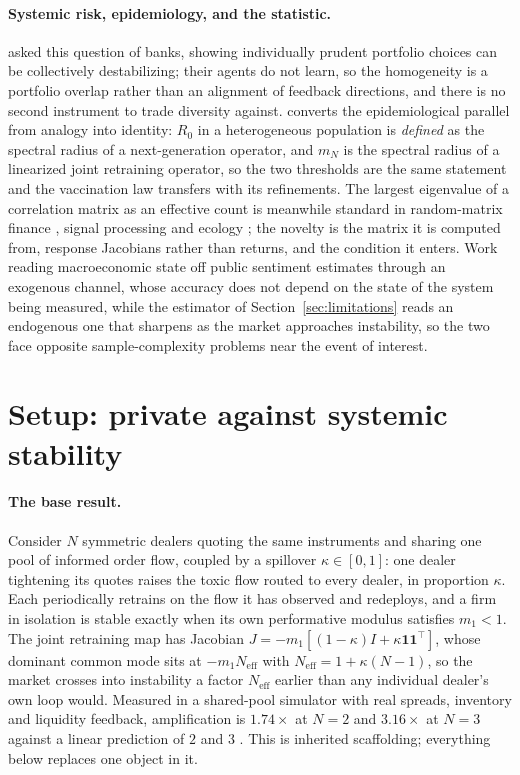\documentclass{article}
\theoremstyle{plain}
\theoremstyle{definition}
\newcommand{\Neff}{N_{\mathrm{eff}}}
\newcommand{\mN}{m_N}
\begin{document}
\paragraph{Systemic risk, epidemiology, and the statistic.}
\citet{beale2011} asked this question of banks, showing individually prudent portfolio choices can be collectively destabilizing; their agents do not learn, so the homogeneity is a portfolio overlap rather than an alignment of feedback directions, and there is no second instrument to trade diversity against. \citet{diekmann1990} converts the epidemiological parallel from analogy into identity: $R_0$ in a heterogeneous population is \emph{defined} as the spectral radius of a next-generation operator, and $\mN$ is the spectral radius of a linearized joint retraining operator, so the two thresholds are the same statement and the vaccination law transfers with its refinements. The largest eigenvalue of a correlation matrix as an effective count is meanwhile standard in random-matrix finance \citep{laloux1999,plerou2002}, signal processing \citep{roy2007} and ecology \citep{hill1973}; the novelty is the matrix it is computed from, response Jacobians rather than returns, and the condition it enters. Work reading macroeconomic state off public sentiment \citep{pebsa2024} estimates through an exogenous channel, whose accuracy does not depend on the state of the system being measured, while the estimator of Section~\ref{sec:limitations} reads an endogenous one that sharpens as the market approaches instability, so the two face opposite sample-complexity problems near the event of interest.

\section{Setup: private against systemic stability}
\label{sec:setup}

\paragraph{The base result.}
Consider $N$ symmetric dealers quoting the same instruments and sharing one pool of informed order flow, coupled by a spillover $\kappa \in [0,1]$: one dealer tightening its quotes raises the toxic flow routed to every dealer, in proportion $\kappa$. Each periodically retrains on the flow it has observed and redeploys, and a firm in isolation is stable exactly when its own performative modulus satisfies $m_1 < 1$. The joint retraining map has Jacobian $J = -m_1[(1-\kappa)I + \kappa \mathbf{1}\mathbf{1}^{\top}]$, whose dominant common mode sits at $-m_1 \Neff$ with $\Neff = 1+\kappa(N-1)$, so the market crosses into instability a factor $\Neff$ earlier than any individual dealer's own loop would. Measured in a shared-pool simulator with real spreads, inventory and liquidity feedback, amplification is $1.74\times$ at $N=2$ and $3.16\times$ at $N=3$ against a linear prediction of $2$ and $3$ \citep{reflex2026}. This is inherited scaffolding; everything below replaces one object in it.
\end{document}
